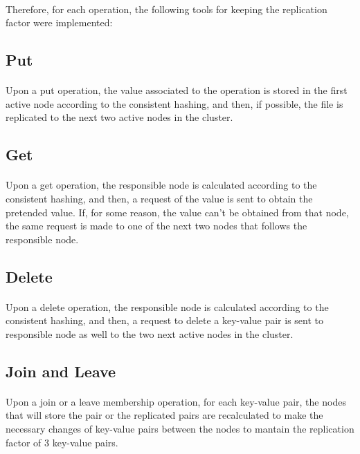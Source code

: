 \documentclass{report}
\begin{document}
				\paragraph{} Therefore, for each operation, the following tools for 
				keeping the replication factor were implemented:
				
				\subsection{Put}
					\paragraph{} Upon a put operation, the value associated to the
					operation is stored in the first active node according to the 
					consistent hashing, and then, if possible, the file is replicated to 
					the next two active nodes in the cluster.

				\subsection{Get}
					\paragraph{} Upon a get operation, the responsible node is calculated
					according to the consistent hashing, and then, a request of the value
					is sent to obtain the pretended value. If, for some reason, the 
					value can't be obtained from that node, the same request 
					is made to one of the next two nodes that follows the responsible 
					node.

				\subsection{Delete}
					\paragraph{} Upon a delete operation, the responsible node is calculated
					according to the consistent hashing, and then, a request to delete a
					key-value pair is sent to responsible node as well to the two next 
					active nodes in the cluster.

				\subsection{Join and Leave}
					\paragraph{} Upon a join or a leave membership operation, for each key-value 
					pair, the nodes that will store the pair or the replicated pairs are
					recalculated to make the necessary changes of key-value pairs between
					the nodes to mantain the replication factor of 3 key-value pairs.
\end{document}
